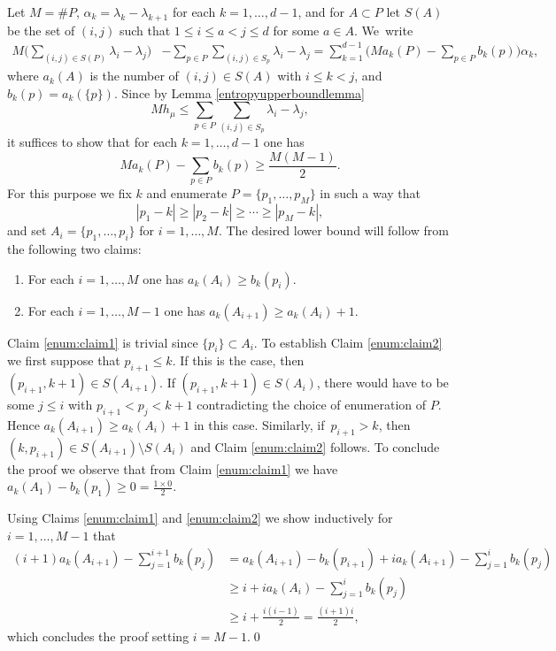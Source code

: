 \documentclass[JEP,XML,SOM,Unicode,NoEqCountersInSection,published]{cedram}
\begin{document}
Let \(M= \#P\), \(\alpha_k = \lambda_{k} - \lambda_{k+1}\) for each \(k = 1,\ldots, d-1\), and for \(A \subset P\) let \(S(A)\) be the set of \((i,j)\) such that \(1 \le i \le a < j \le d\) for some \(a \in A\). We~write
\begin{align*}
M \biggl(\sum_{(i,j) \in S(P)}\lambda_i - \lambda_j\biggr) &- \sum_{p \in P}\sum_{(i,j) \in S_p}\lambda_i - \lambda_j
= \sum_{k = 1}^{d-1} \biggl(Ma_k(P) - \sum_{p \in P}b_k(p)\biggr)\alpha_k,
\end{align*}
where \(a_k(A)\) is the number of \((i,j) \in S(A)\) with \(i \le k < j\), and \(b_k(p) = a_k(\lbrace p\rbrace)\).
Since by Lemma \ref{entropyupperboundlemma}
\[
M h_\mu \le \sum_{p \in P}\sum_{(i,j) \in S_p}\lambda_i - \lambda_j,
\]
it suffices to show that for each \(k = 1,\ldots, d-1\) one has
\[
M a_k(P) - \sum_{p \in P}b_k(p) \ge \frac{M(M-1)}{2}.
\]
For this purpose we fix \(k\) and enumerate \(P = \lbrace p_1,\ldots, p_{M} \rbrace\) in such a way that
\[
|p_1 -k| \ge |p_2 -k| \ge \cdots \ge |p_{M}-k|,
\]
and set \(A_i = \lbrace p_1,\ldots, p_i\rbrace\) for \(i = 1,\ldots,M\).
The desired lower bound will follow from the following two claims:
\begin{enumerate}
\item\label{enum:claim1} For each \(i = 1,\ldots, M\) one has \(a_k(A_i) \ge b_k(p_i)\).
\item\label{enum:claim2} For each \(i = 1,\ldots, M-1\) one has \(a_k(A_{i+1}) \ge a_k(A_i) + 1\).
\end{enumerate}
Claim \eqref{enum:claim1} is trivial since \(\lbrace p_i\rbrace \subset A_i\).
To establish Claim \eqref{enum:claim2} we first suppose that \(p_{i+1} \le k\). If this is the case, then \((p_{i+1},k+1) \in S(A_{i+1})\). If \((p_{i+1},k+1) \in S(A_i)\), there would have to be some \(j \le i\) with \(p_{i+1} < p_j < k+1\) contradicting the choice of enumeration of \(P\). Hence \(a_k(A_{i+1}) \ge a_k(A_i) + 1\) in this case. Similarly, if~\(p_{i+1} > k\), then \((k,p_{i+1}) \in S(A_{i+1}) \setminus S(A_i)\) and Claim \eqref{enum:claim2} follows.
To conclude the proof we observe that from Claim \eqref{enum:claim1} we have \(a_k(A_1) - b_k(p_1) \ge 0 = \frac{1 \times 0}{2}\).

Using Claims \eqref{enum:claim1} and \eqref{enum:claim2} we show inductively for \(i = 1,\ldots, M-1\) that
\begin{align*}(i+1)a_k(A_{i+1}) - \sum_{j = 1}^{i+1}b_k(p_j) &= a_k(A_{i+1}) - b_k(p_{i+1}) + ia_k(A_{i+1}) - \sum_{j = 1}^i b_k(p_j)
\\[
-8pt] & \ge i + i a_k(A_i) - \sum_{j = 1}^i b_k(p_j)
\\ & \ge i + \frac{i(i-1)}{2} = \frac{(i+1)i}{2},
\end{align*}
which concludes the proof setting \(i = M-1\).\qed
\end{document}
